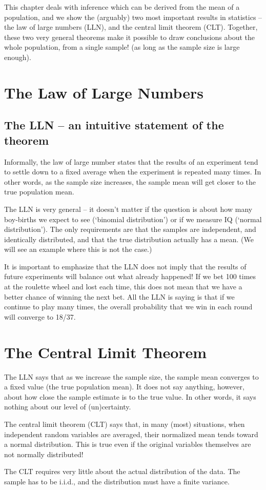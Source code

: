 This chapter deals with inference which can be derived from the mean of a population, and we show the (arguably) two most important results in statistics -- the law of large numbers (LLN), and the central limit theorem (CLT). Together, these two very general theorems make it possible to draw conclusions about the whole population, from a single sample! (as long as the sample size is large enough).


\section{The Law of Large Numbers}







\subsection{The LLN -- an intuitive statement of the theorem}
Informally, the law of large number states that the results of an experiment tend to settle down to a fixed average when the experiment is repeated many times. In other words, as the sample size increases, the sample mean will get closer to the true population mean.

The LLN is very general -- it doesn't matter if the question is about how many boy-births we expect to see (`binomial distribution') or if we measure IQ (`normal distribution'). The only requirements are that the samples are independent, and identically distributed, and that the true distribution actually has a mean. (We will see an example where this is not the case.)

It is important to emphasize that the LLN does not imply that the results of future experiments will balance out what already happened! If we bet 100 times at the roulette wheel and lost each time, this does not mean that we have a better chance of winning the next bet. All the LLN is saying is that if we continue to play many times, the overall probability that we win in each round will converge to 18/37.




\section{The Central Limit Theorem}
The LLN says that as we increase the sample size, the sample mean converges to a fixed value (the true population mean).  It does not say anything, however, about how close the sample estimate is to the true value. In other words, it says nothing about our level of (un)certainty. 

The central limit theorem (CLT) says that, in many (most) situations, when independent random variables are averaged, their normalized mean tends toward a normal distribution. This is true even if the original variables themselves are not normally distributed!

The CLT requires very little about the actual distribution of the data. The sample has to be i.i.d., and the distribution must have a finite variance. 


